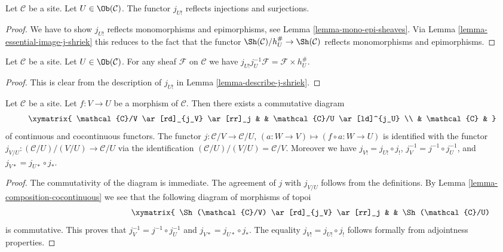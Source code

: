 \begin{lemma}
\label{lemma-j-shriek-reflects-injections-surjections}
Let $\mathcal{C}$ be a site. Let $U \in \Ob(\mathcal{C})$.
The functor $j_{U!}$ reflects injections and surjections.
\end{lemma}

\begin{proof}
We have to show $j_{U!}$ reflects monomorphisms and epimorphisms, see
Lemma \ref{lemma-mono-epi-sheaves}.
Via Lemma \ref{lemma-essential-image-j-shriek}
this reduces to the fact that the functor
$\Sh(\mathcal{C})/h_U^\# \to \Sh(\mathcal{C})$
reflects monomorphisms and epimorphisms.
\end{proof}

\begin{lemma}
\label{lemma-compute-j-shriek-restrict}
Let $\mathcal{C}$ be a site. Let $U \in \Ob(\mathcal{C})$.
For any sheaf $\mathcal{F}$ on $\mathcal{C}$ we have
$j_{U!}j_U^{-1}\mathcal{F} = \mathcal{F} \times h_U^\#$.
\end{lemma}

\begin{proof}
This is clear from the description of $j_{U!}$ in
Lemma \ref{lemma-describe-j-shriek}.
\end{proof}

\begin{lemma}
\label{lemma-relocalize}
Let $\mathcal{C}$ be a site.
Let $f : V \to U$ be a morphism of $\mathcal{C}$.
Then there exists a commutative diagram
$$
\xymatrix{
\mathcal{C}/V \ar[rd]_{j_V} \ar[rr]_j & &
\mathcal{C}/U \ar[ld]^{j_U} \\
& \mathcal{C} &
}
$$
of continuous and cocontinuous functors.
The functor $j : \mathcal{C}/V \to \mathcal{C}/U$,
$(a : W \to V) \mapsto (f \circ a : W \to U)$
is identified with the functor
$j_{V/U} : (\mathcal{C}/U)/(V/U) \to \mathcal{C}/U$
via the identification $(\mathcal{C}/U)/(V/U) = \mathcal{C}/V$.
Moreover we have $j_{V!} = j_{U!} \circ j_!$,
$j_V^{-1} = j^{-1} \circ j_U^{-1}$, and
$j_{V*} = j_{U*} \circ j_*$.
\end{lemma}

\begin{proof}
The commutativity of the diagram is immediate.
The agreement of $j$ with $j_{V/U}$ follows from the definitions. By
Lemma \ref{lemma-composition-cocontinuous}
we see that the following diagram of morphisms of topoi
\begin{equation}
\label{equation-relocalize}
\vcenter{
\xymatrix{
\Sh(\mathcal{C}/V) \ar[rd]_{j_V} \ar[rr]_j & &
\Sh(\mathcal{C}/U) \ar[ld]^{j_U} \\
& \Sh(\mathcal{C}) &
}
}
\end{equation}
is commutative. This proves that
$j_V^{-1} = j^{-1} \circ j_U^{-1}$ and $j_{V*} = j_{U*} \circ j_*$.
The equality $j_{V!} = j_{U!} \circ j_!$
follows formally from adjointness properties.
\end{proof}

